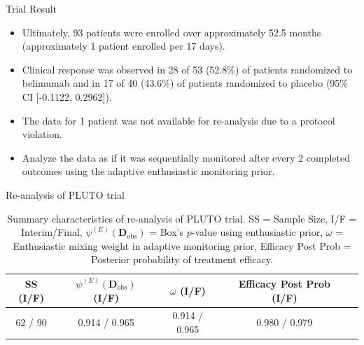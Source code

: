 \documentclass{beamer}
\begin{document}
\begin{frame}{Trial Result}
\begin{itemize}
\item Ultimately, 93 patients were enrolled over approximately 52.5 months (approximately 1 patient enrolled per 17 days).
%
\item Clinical response was observed in 28 of 53 (52.8\%) of patients randomized to belimumab and in 17 of 40 (43.6\%) of patients randomized to placebo (95\% CI [-0.1122, 0.2962]).
\item The data for 1 patient was not available for re-analysis due to a protocol violation.
\item Analyze the data as if it was sequentially monitored after every 2 completed outcomes using the adaptive enthusiastic monitoring prior.
\end{itemize}
\end{frame}

\begin{frame}{Re-analysis of PLUTO trial}
\footnotesize
\begin{table}[htbp]\label{tbl:real-pluto}%
\centering
\caption{Summary characteristics of re-analysis of PLUTO trial. SS = Sample Size, I/F = Interim/Final, $\psi^{(E)}(\mathbf{D}_{\text{obs}})$ = Box's $p$-value using enthusiastic prior, $\omega$ = Enthusiastic mixing weight in adaptive monitoring prior, Efficacy Post Prob = Posterior probability of treatment efficacy.}%
\begin{tabular*}{300pt}{@{\extracolsep\fill}ccccc@{\extracolsep\fill}}%
\toprule
SS (I/F)			&	$\psi^{(E)}(\mathbf{D}_{\text{obs}})$ (I/F)			&	$\omega$ (I/F)			&	Efficacy Post Prob (I/F)			\\
\midrule
62	/	90	&	0.914	/	0.965	&	0.914	/	0.965	&	0.980	/	0.979	\\
\bottomrule
\end{tabular*}
\end{table}
\end{frame}
\end{document}
